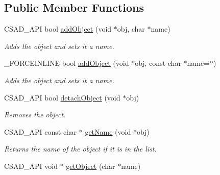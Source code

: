 \subsection*{Public Member Functions}
\begin{DoxyCompactItemize}
\item 
\hypertarget{classcsad_1_1_object_manager_ad68b9f728555715e9e6109e746c846d2}{C\-S\-A\-D\-\_\-\-A\-P\-I bool \hyperlink{classcsad_1_1_object_manager_ad68b9f728555715e9e6109e746c846d2}{add\-Object} (void $\ast$obj, char $\ast$name)}\label{classcsad_1_1_object_manager_ad68b9f728555715e9e6109e746c846d2}

\begin{DoxyCompactList}\small\item\em Adds the object and sets it a name. \end{DoxyCompactList}\item 
\hypertarget{classcsad_1_1_object_manager_a1d65df20a751e700f9185bf7eafe48dc}{\-\_\-\-F\-O\-R\-C\-E\-I\-N\-L\-I\-N\-E bool \hyperlink{classcsad_1_1_object_manager_a1d65df20a751e700f9185bf7eafe48dc}{add\-Object} (void $\ast$obj, const char $\ast$name=\char`\"{}\char`\"{})}\label{classcsad_1_1_object_manager_a1d65df20a751e700f9185bf7eafe48dc}

\begin{DoxyCompactList}\small\item\em Adds the object and sets it a name. \end{DoxyCompactList}\item 
\hypertarget{classcsad_1_1_object_manager_af712f3df6c4780a1a8a3971a65f49aeb}{C\-S\-A\-D\-\_\-\-A\-P\-I bool \hyperlink{classcsad_1_1_object_manager_af712f3df6c4780a1a8a3971a65f49aeb}{detach\-Object} (void $\ast$obj)}\label{classcsad_1_1_object_manager_af712f3df6c4780a1a8a3971a65f49aeb}

\begin{DoxyCompactList}\small\item\em Removes the object. \end{DoxyCompactList}\item 
\hypertarget{classcsad_1_1_object_manager_ad0e7a1030297c6516b8c963c5f65254e}{C\-S\-A\-D\-\_\-\-A\-P\-I const char $\ast$ \hyperlink{classcsad_1_1_object_manager_ad0e7a1030297c6516b8c963c5f65254e}{get\-Name} (void $\ast$obj)}\label{classcsad_1_1_object_manager_ad0e7a1030297c6516b8c963c5f65254e}

\begin{DoxyCompactList}\small\item\em Returns the name of the object if it is in the list. \end{DoxyCompactList}\item 
\hypertarget{classcsad_1_1_object_manager_a174709ddda723c6a7a71cf52c19292a6}{C\-S\-A\-D\-\_\-\-A\-P\-I void $\ast$ \hyperlink{classcsad_1_1_object_manager_a174709ddda723c6a7a71cf52c19292a6}{get\-Object} (char $\ast$name)}\label{classcsad_1_1_object_manager_a174709ddda723c6a7a71cf52c19292a6}


\end{DoxyCompactItemize}
